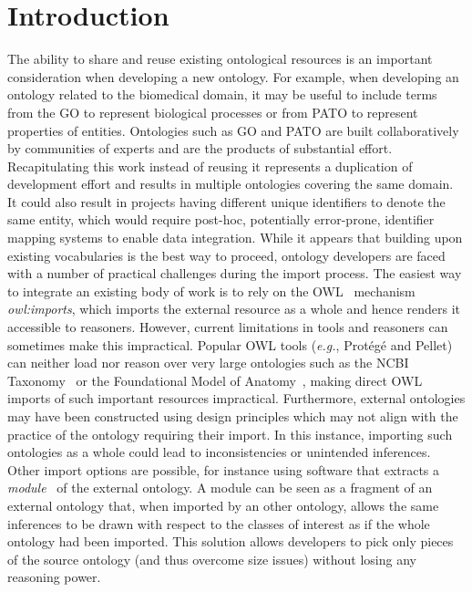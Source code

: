 \documentclass{ao2e}%
\begin{document}
\section{Introduction}

The ability to share and reuse existing ontological resources is an important consideration when developing a new ontology.
For example, when developing an ontology related to the biomedical domain, it may be useful to include terms from the \ac{GO}\cite{GO} to represent biological processes or from \ac{PATO}\cite{PATO} to represent properties of entities.
Ontologies such as GO and PATO are built collaboratively by communities of experts and are the products of substantial effort.
Recapitulating this work instead of reusing it represents a duplication of development effort and results in multiple ontologies covering the same domain. It could also result in projects having different unique identifiers to denote the same entity, which would require post-hoc, potentially error-prone, identifier mapping systems to enable data integration. 
While it appears that building upon existing vocabularies is the best way to proceed, ontology developers are faced with a number of practical challenges during the import process.
The easiest way to integrate an existing body of work is to rely on the \ac{OWL}~\cite{OWL} mechanism \emph{owl:imports}, which imports the external resource as a whole and hence renders it accessible to reasoners. However, current limitations in tools and reasoners can sometimes make this impractical.
Popular OWL tools (\emph{e.g.}, Prot\'eg\'e\cite{Protege} and Pellet\cite{Sirin}) can neither load nor reason over very large ontologies such as the NCBI Taxonomy~\cite{NCBI} or the Foundational Model of Anatomy~\cite{FMA}, making direct \ac{OWL} imports of such important resources impractical. 
Furthermore, external ontologies may have been constructed using design principles which may not align with the practice of the ontology requiring their import.  In this instance, importing such ontologies as a whole could lead to inconsistencies or unintended inferences. %
Other import options are possible, for instance using software that extracts a \emph{module}~\cite{Grau} of the external ontology.
A module can be seen as a fragment of an external ontology that, when imported by an other ontology, allows the same inferences to be drawn with respect to the classes of interest as if the whole ontology had been imported. This solution allows developers to pick only pieces of the source ontology (and thus overcome size issues) without losing any reasoning power.
\end{document}
